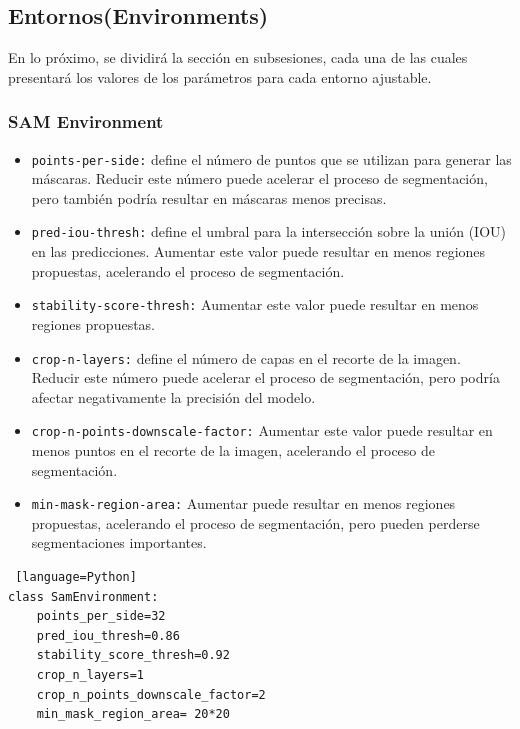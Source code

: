 \subsection{Entornos(Environments)}
En lo próximo, se dividirá la sección en subsesiones, cada una de las cuales presentará los valores de los parámetros para cada entorno ajustable.

\subsubsection*{SAM Environment}
\begin{itemize}
\item \verb|points-per-side:| define el número de puntos que se utilizan para generar las máscaras. Reducir este número puede acelerar el proceso de segmentación, pero también podría resultar en máscaras menos precisas.
\item \verb|pred-iou-thresh:| define el umbral para la intersección sobre la unión (IOU) en las predicciones. Aumentar este valor puede resultar en menos regiones propuestas, acelerando el proceso de segmentación.
\item \verb|stability-score-thresh:| Aumentar este valor puede resultar en menos regiones propuestas.
\item \verb|crop-n-layers:| define el número de capas en el recorte de la imagen. Reducir este número puede acelerar el proceso de segmentación, pero podría afectar negativamente la precisión del modelo.
\item \verb|crop-n-points-downscale-factor:| Aumentar este valor puede resultar en menos puntos en el recorte de la imagen, acelerando el proceso de segmentación.
\item \verb|min-mask-region-area:| Aumentar puede resultar en menos regiones propuestas, acelerando el proceso de segmentación, pero pueden perderse segmentaciones importantes.
\end{itemize}

\begin{lstlisting} [language=Python]
class SamEnvironment:
    points_per_side=32
    pred_iou_thresh=0.86
    stability_score_thresh=0.92
    crop_n_layers=1
    crop_n_points_downscale_factor=2
    min_mask_region_area= 20*20
\end{lstlisting} 


